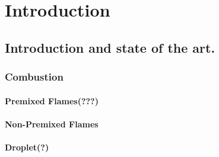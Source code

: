 \chapter{Introduction}	\label{ch:introduction}











 

\section{Introduction and state of the art.}
\subsection{Combustion}
\subsubsection{Premixed Flames(???)}
\subsubsection{Non-Premixed Flames}
\subsubsection{Droplet(?)}


